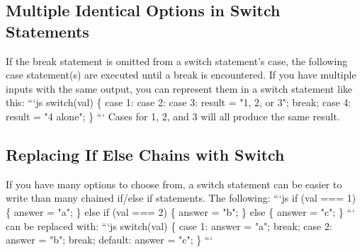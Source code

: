 \documentclass{article}%
\begin{document}
%
\subsection{Multiple Identical Options in Switch Statements}%
\label{subsec:MultipleIdenticalOptionsinSwitchStatements}%
If the break statement is omitted from a switch statement's case, the following case statement(s) are executed until a break is encountered. If you have multiple inputs with the same output, you can represent them in a switch statement like this:\newline%
```js\newline%
switch(val) \{\newline%
  case 1:\newline%
  case 2:\newline%
  case 3:\newline%
    result = "1, 2, or 3";\newline%
    break;\newline%
  case 4:\newline%
    result = "4 alone";\newline%
\}\newline%
```\newline%
Cases for 1, 2, and 3 will all produce the same result.\newline%

%
\subsection{Replacing If Else Chains with Switch}%
\label{subsec:ReplacingIfElseChainswithSwitch}%
If you have many options to choose from, a switch statement can be easier to write than many chained if/else if statements. The following:\newline%
```js\newline%
if (val === 1) \{\newline%
  answer = "a";\newline%
\} else if (val === 2) \{\newline%
  answer = "b";\newline%
\} else \{\newline%
  answer = "c";\newline%
\}\newline%
```\newline%
can be replaced with:\newline%
```js\newline%
switch(val) \{\newline%
  case 1:\newline%
    answer = "a";\newline%
    break;\newline%
  case 2:\newline%
    answer = "b";\newline%
    break;\newline%
  default:\newline%
    answer = "c";\newline%
\}\newline%
```\newline%
\end{document}
